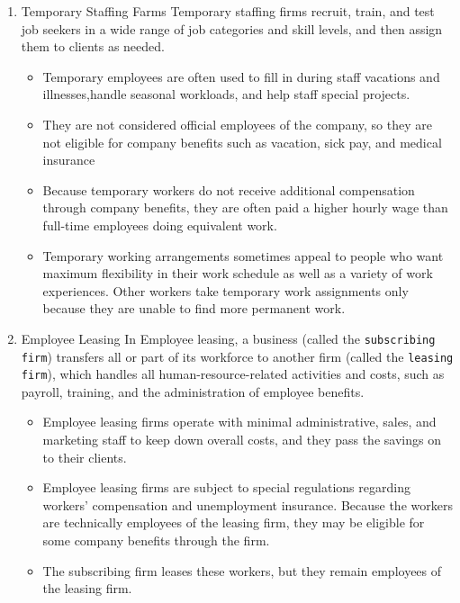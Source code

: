 \documentclass[11pt]{article}
\begin{document}
\begin{enumerate}
\item Temporary Staffing Farms
\label{sec:org41c46cd}
Temporary staffing firms recruit, train, and test job seekers in a wide range of job categories and skill levels, and then assign them to clients as needed.


\begin{itemize}
\item Temporary employees are often used to fill in during staff vacations and illnesses,handle seasonal workloads, and help staff special projects.

\item They are not considered official employees of the company, so they are not eligible for company benefits such as vacation, sick pay, and medical insurance

\item Because temporary workers do not receive additional compensation through company benefits, they are often paid a higher hourly wage than full-time employees doing equivalent work.

\item Temporary working arrangements sometimes appeal to people who want maximum flexibility in their work schedule as well as a variety of work experiences. Other workers take temporary work assignments only because they are unable to find more permanent work.
\end{itemize}

\item Employee Leasing
\label{sec:org16c8510}
In Employee leasing, a business (called the \texttt{subscribing firm}) transfers all or part of its workforce to another firm (called the \texttt{leasing firm}), which handles all human-resource-related activities and costs, such as payroll, training, and the administration of employee benefits.

\begin{itemize}
\item Employee leasing firms operate with minimal administrative, sales, and marketing staff to keep down overall costs, and they pass the savings on to their clients.
\item Employee leasing firms are subject to special regulations regarding workers’ compensation and unemployment insurance. Because the workers are technically employees of the leasing firm, they may be eligible for some company benefits through the firm.

\item The subscribing firm leases these workers, but they remain employees of the leasing firm.
\end{itemize}


\end{enumerate}
\end{document}
